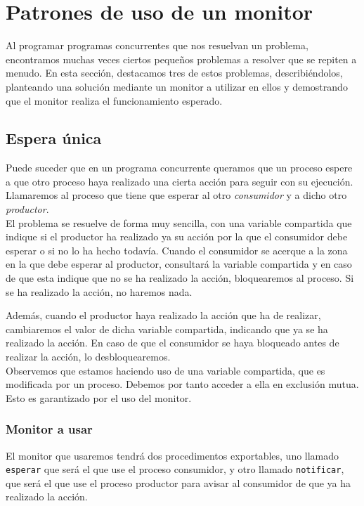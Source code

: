 \section{Patrones de uso de un monitor}
Al programar programas concurrentes que nos resuelvan un problema, encontramos muchas veces ciertos pequeños problemas a resolver que se repiten a menudo. En esta sección, destacamos tres de estos problemas, describiéndolos, planteando una solución mediante un monitor a utilizar en ellos y demostrando que el monitor realiza el funcionamiento esperado.

\subsection{Espera única}
Puede suceder que en un programa concurrente queramos que un proceso espere a que otro proceso haya realizado una cierta acción para seguir con su ejecución. Llamaremos al proceso que tiene que esperar al otro \textit{consumidor} y a dicho otro \textit{productor}.\\

El problema se resuelve de forma muy sencilla, con una variable compartida que indique si el productor ha realizado ya su acción por la que el consumidor debe esperar o si no lo ha hecho todavía. Cuando el consumidor se acerque a la zona en la que debe esperar al productor, consultará la variable compartida y en caso de que esta indique que no se ha realizado la acción, bloquearemos al proceso. Si se ha realizado la acción, no haremos nada.

Además, cuando el productor haya realizado la acción que ha de realizar, cambiaremos el valor de dicha variable compartida, indicando que ya se ha realizado la acción. En caso de que el consumidor se haya bloqueado antes de realizar la acción, lo desbloquearemos.\\

Observemos que estamos haciendo uso de una variable compartida, que es modificada por un proceso. Debemos por tanto acceder a ella en exclusión mutua. Esto es garantizado por el uso del monitor.

\subsubsection{Monitor a usar}
El monitor que usaremos tendrá dos procedimentos exportables, uno llamado \verb|esperar| que será el que use el proceso consumidor, y otro llamado \verb|notificar|, que será el que use el proceso productor para avisar al consumidor de que ya ha realizado la acción.

